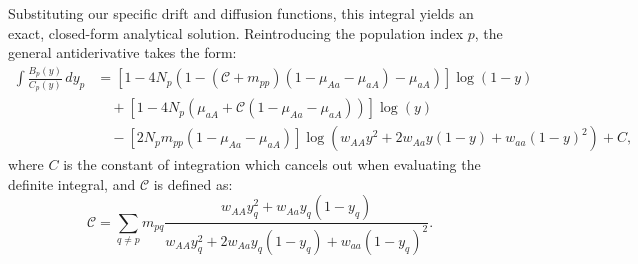\documentclass{article}
\begin{document}
Substituting our specific drift and diffusion functions, this integral yields an exact, closed-form analytical solution.
Reintroducing the population index $p$, the general antiderivative takes the form:
\begin{equation*}
\begin{split}
\int \frac{B_p(y)}{C_p(y)} \, dy_p &=  
\left[ 1 - 4 N_p (1 - (\mathcal{C} + m_{pp})(1 - \mu_{Aa} - \mu_{aA}) - \mu_{aA}) \right] \log(1 - y) \\
&\quad + \left[ 1 - 4 N_p (\mu_{aA} + \mathcal{C} (1 - \mu_{Aa} - \mu_{aA})) \right] \log(y) \\
&\quad - \left[ 2 N_p m_{pp} (1 - \mu_{Aa} - \mu_{aA}) \right] \log\left(w_{AA} y^2  + 2 w_{Aa} y (1-y) + w_{aa} (1 - y)^2\right) + C,
\end{split}
\end{equation*}
where $C$ is the constant of integration which cancels out when evaluating the definite integral, and $\mathcal{C}$ is defined as:
\begin{equation*}
\mathcal{C} = \sum_{q \neq p} m_{pq} \frac{w_{AA} y_q^2 + w_{Aa} y_q (1 - y_q)}{w_{AA} y_q^2 + 2 w_{Aa} y_q (1 - y_q) + w_{aa}(1-y_q)^2}.
\end{equation*}

\bigskip
\end{document}
